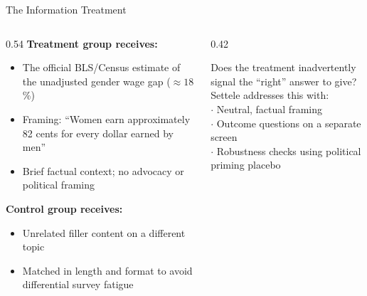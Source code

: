 \documentclass[aspectratio=169, 11pt]{beamer}
\begin{document}

\begin{frame}[t]{The Information Treatment}
\begin{columns}[T]
\begin{column}{0.54\textwidth}
\textbf{Treatment group receives:}
\begin{itemize}
  \setlength\itemsep{0.4em}
  \item The official BLS/Census estimate of the unadjusted gender wage gap ($\approx 18$\%)
  \item Framing: ``Women earn approximately 82 cents for every dollar earned by men''
  \item Brief factual context; no advocacy or political framing
\end{itemize}
\vspace{0.4em}
\textbf{Control group receives:}
\begin{itemize}
  \setlength\itemsep{0.4em}
  \item Unrelated filler content on a different topic
  \item Matched in length and format to avoid differential survey fatigue
\end{itemize}
\end{column}
\begin{column}{0.42\textwidth}
\begin{warningbox}
Does the treatment inadvertently signal the ``right'' answer to give?\\[0.3em]
Settele addresses this with:\\[0.2em]
$\cdot$ Neutral, factual framing\\
$\cdot$ Outcome questions on a separate screen\\
$\cdot$ Robustness checks using political priming placebo
\end{warningbox}
\end{column}
\end{columns}
\end{frame}

\end{document}
